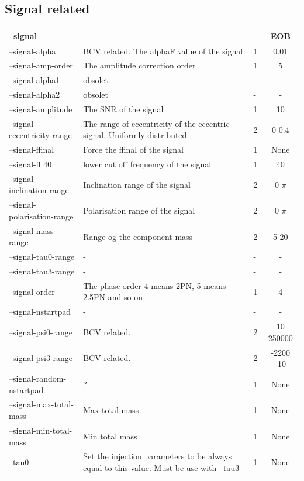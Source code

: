 \documentclass[a4paper,10pt]{article}
\begin{document}
\begin{center}
\begin{tabular}{|l|p{6cm}|p{3cm}|c|}
\end{tabular} 
\end{center}



\subsection{Signal related}
\begin{center}
\begin{tabular}{|l|p{8cm}|p{3cm}|c|}
\hline
--signal &&&EOB\\\hline
--signal-alpha& BCV related. The alphaF value of the signal&1&0.01\\\hline
--signal-amp-order&The amplitude correction order&1&5\\\hline
--signal-alpha1&obsolet&-&-\\\hline
--signal-alpha2&obsolet&-&-\\\hline
--signal-amplitude&The SNR of the signal&1&10\\\hline
--signal-eccentricity-range&The range of eccentricity of the eccentric signal. Uniformly distributed&2&0 0.4\\\hline
--signal-ffinal&Force the ffinal of the signal& 1&None\\\hline
--signal-fl 40&lower cut off frequency of the signal&1&40\\\hline
--signal-inclination-range&Inclination range of the signal&2&0 $\pi$\\\hline
--signal-polarisation-range&Polarisation range of the signal&2&0 $\pi$\\\hline
--signal-mass-range&Range og the component mass&2&5 20\\\hline
--signal-tau0-range&-&-&-\\\hline
--signal-tau3-range&-&-&-\\\hline
--signal-order&The phase order 4 means 2PN, 5 means 2.5PN and so on&1&4\\\hline
--signal-nstartpad&-&-&-\\\hline
--signal-psi0-range&BCV related.&2&10 250000\\\hline
--signal-psi3-range&BCV related.&2&-2200 -10\\\hline
--signal-random-nstartpad&?&1&None\\\hline
--signal-max-total-mass&Max total mass &1&None\\\hline
--signal-min-total-mass&Min total mass&1&None\\\hline
\hline
--tau0 &Set the injection parameters to be always equal to this value. Must be use with --tau3&1&None\\\hline

\end{tabular}
\end{center}
\end{document}
